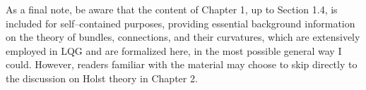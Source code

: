 
As a final note, be aware that the content of Chapter 1, up to Section 1.4, is included for self--contained purposes, providing essential background information on the theory of bundles, connections, and their curvatures, which are extensively employed in LQG and are formalized here, in the most possible general way I could. However, readers familiar with the material may choose to skip directly to the discussion on Holst theory in Chapter 2.